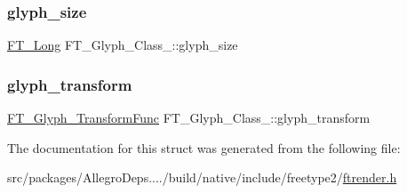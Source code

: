 \subsubsection{\texorpdfstring{glyph\+\_\+size}{glyph\_size}}
{\footnotesize\ttfamily \hyperlink{fttypes_8h_a7fa72a1f0e79fb1860c5965789024d6f}{F\+T\+\_\+\+Long} F\+T\+\_\+\+Glyph\+\_\+\+Class\+\_\+\+::glyph\+\_\+size}

\mbox{\label{struct_f_t___glyph___class___a5f72ac1d0d92eb31fa3e2bb721a97ef2}} 
\subsubsection{\texorpdfstring{glyph\+\_\+transform}{glyph\_transform}}
{\footnotesize\ttfamily \hyperlink{ftrender_8h_a6e39ad832662366565c93c53cf56fd0d}{F\+T\+\_\+\+Glyph\+\_\+\+Transform\+Func} F\+T\+\_\+\+Glyph\+\_\+\+Class\+\_\+\+::glyph\+\_\+transform}



The documentation for this struct was generated from the following file\+:\begin{DoxyCompactItemize}
\item 
src/packages/\+Allegro\+Deps..../build/native/include/freetype2/\hyperlink{ftrender_8h}{ftrender.\+h}\end{DoxyCompactItemize}
